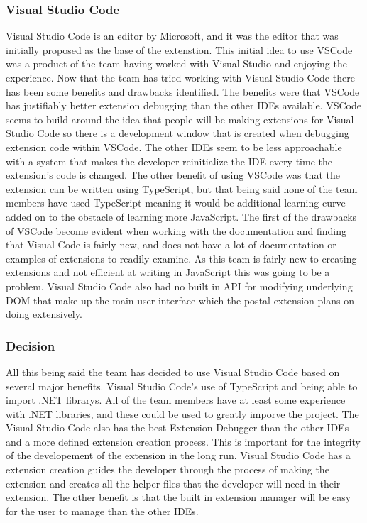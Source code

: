 \documentclass[letterpaper,10pt,titlepage,draftclsnofoot,onecolumn,onesided] {IEEEtran}
\begin{document}
\subsubsection{Visual Studio Code}
Visual Studio Code is an editor by Microsoft, and it was the editor that was initially proposed as the base of the extenstion. 
This initial idea to use VSCode was a product of the team having worked with Visual Studio and enjoying the experience. 
Now that the team has tried working with Visual Studio Code there has been some benefits and drawbacks identified. 
The benefits were that VSCode has justifiably better extension debugging than the other IDEs available. 
VSCode seems to build around the idea that people will be making extensions for Visual Studio Code so there is a development window that is created when debugging extension code within VSCode. 
The other IDEs seem to be less approachable with a system that makes the developer reinitialize the IDE every time the extension's code is changed. 
The other benefit of using VSCode was that the extension can be written using TypeScript, but that being said none of the team members have used TypeScript meaning it would be additional learning curve added on to the obstacle of learning more JavaScript. 
The first of the drawbacks of VSCode become evident when working with the documentation and finding that Visual Code is fairly new, and does not have a lot of documentation or examples of extensions to readily examine. 
As this team is fairly new to creating extensions and not efficient at writing in JavaScript this was going to be a problem. 
Visual Studio Code also had no built in API for modifying underlying DOM that make up the main user interface which the postal extension plans on doing extensively.

\subsubsection{Decision}
All this being said the team has decided to use Visual Studio Code based on several major benefits. 
Visual Studio Code's use of TypeScript and being able to import .NET librarys. 
All of the team members have at least some experience with .NET libraries, and these could be used to greatly imporve the project. 
The Visual Studio Code also has the best Extension Debugger than the other IDEs and a more defined extension creation process.
This is important for the integrity of the developement of the extension in the long run. 
Visual Studio Code has a extension creation guides the developer through the process of making the extension and creates all the helper files that the developer will need in their extension.
The other benefit is that the built in extension manager will be easy for the user to manage than the other IDEs. 
\end{document}
